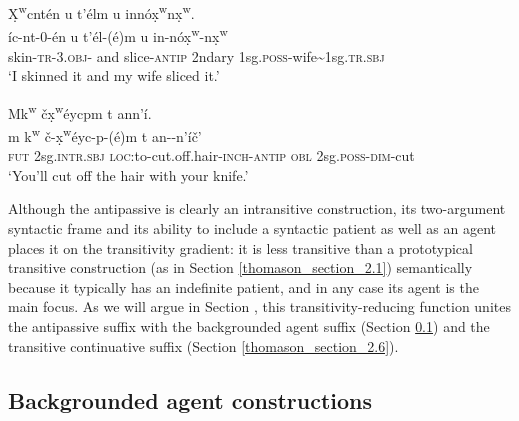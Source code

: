 \documentclass[output=paper,colorlinks,citecolor=brown]{langscibook}
\begin{document}
\ea 
\label{ex-thomason-16}
{\d{X}\textsuperscript w}cnt\'en u t'\'elm {\textltilde}u inn\'o{\d{x}\textsuperscript w}n{\d{x}\textsuperscript w}.  \\
\'ic-nt-0-\'en u t'\'el-(\'e)m
{\textltilde}u in-n\'o{\d{x}\textsuperscript w}-n{\d{x}\textsuperscript w} \\
skin-\textsc{tr}-3.\textsc{obj}- and slice-\textsc{antip} 2ndary 1sg.\textsc{poss}-wife\textasciitilde{}1sg.\textsc{tr.sbj} \\
\glt `I skinned it and my wife sliced it.'
\z

\ea 
\label{ex-thomason-17}
Mk\textsuperscript w \v{c}\d{x}\textsuperscript w\'eycpm t an{\textltilde}n'\'i. \\
 \gll m k{\textsuperscript w} \v{c}-\d{x}{\textsuperscript w}\'eyc-p-(\'e)m t
an-\textltilde-n'\'i\v{c}'\\ 
\textsc{fut} 2sg.\textsc{intr.sbj} \textsc{loc:}to-cut.off.hair-\textsc{inch}-\textsc{antip} \textsc{obl} 2sg.\textsc{poss}-\textsc{dim}-cut\\
 \glt `You'll cut off the hair with your knife.'
 \z


Although the antipassive is clearly an intransitive construction, its
two-argument syntactic frame and its ability to include a syntactic
patient as well as an agent places it on the transitivity gradient: it
is less transitive than a prototypical transitive construction (as in
Section \ref{thomason_section_2.1}) semantically because it typically has an indefinite patient,
and in any case its agent is the main focus.  As we will argue in Section , this transitivity-reducing function unites the antipassive suffix
with the backgrounded agent suffix (Section \ref{thomason_section_2.5}) and the transitive
continuative suffix (Section \ref{thomason_section_2.6}).

\subsection{Backgrounded agent constructions} %
\label{thomason_section_2.5}
\end{document}
